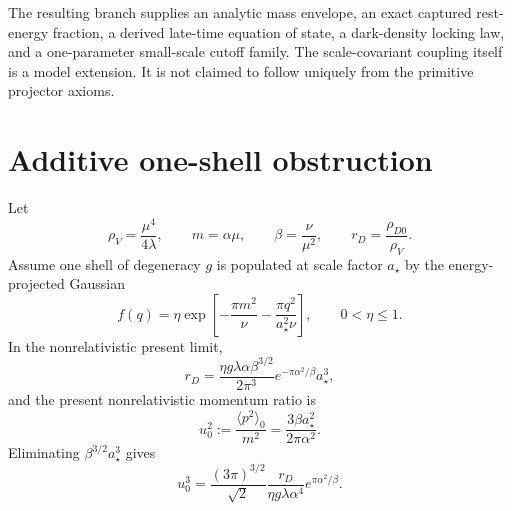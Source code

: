 The resulting branch supplies an analytic mass envelope, an exact captured rest-energy fraction, a derived late-time equation of state, a dark-density locking law, and a one-parameter small-scale cutoff family.  The scale-covariant coupling itself is a model extension.  It is not claimed to follow uniquely from the primitive projector axioms.

\section{Additive one-shell obstruction}

Let
\begin{equation}
 \rho_V=\frac{\mu^4}{4\lambda},
 \qquad
 m=\alpha\mu,
 \qquad
 \beta=\frac{\nu}{\mu^2},
 \qquad
 r_D=\frac{\rho_{D0}}{\rho_V}.
 \label{eq:scw-additive-definitions}
\end{equation}
Assume one shell of degeneracy $g$ is populated at scale factor $a_\star$ by the energy-projected Gaussian
\begin{equation}
 f(q)
 =\eta
 \exp\left[
 -\frac{\pi m^2}{\nu}
 -\frac{\pi q^2}{a_\star^2\nu}
 \right],
 \qquad
 0<\eta\leq1.
 \label{eq:scw-additive-distribution}
\end{equation}
In the nonrelativistic present limit,
\begin{equation}
 r_D
 =
 \frac{\eta g\lambda\alpha\beta^{3/2}}{2\pi^3}
 e^{-\pi\alpha^2/\beta}
 a_\star^3,
 \label{eq:scw-additive-abundance}
\end{equation}
and the present nonrelativistic momentum ratio is
\begin{equation}
 u_0^2
 :=\frac{\langle p^2\rangle_0}{m^2}
 =\frac{3\beta a_\star^2}{2\pi\alpha^2}.
 \label{eq:scw-additive-speed}
\end{equation}
Eliminating $\beta^{3/2}a_\star^3$ gives
\begin{equation}
 u_0^3
 =
 \frac{(3\pi)^{3/2}}{\sqrt2}
 \frac{r_D}{\eta g\lambda\alpha^4}
 e^{\pi\alpha^2/\beta}.
 \label{eq:scw-additive-elimination}
\end{equation}

